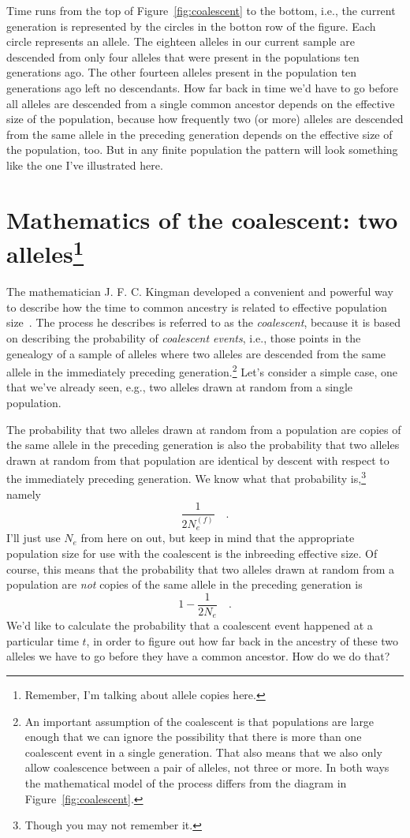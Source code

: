 \documentclass[12pt]{article}
\begin{document}
Time runs from the top of Figure~\ref{fig:coalescent} to the bottom,
i.e., the current generation is represented by the circles in the
botton row of the figure. Each circle represents an allele. The
eighteen alleles in our current sample are descended from only four
alleles that were present in the populations ten generations ago. The
other fourteen alleles present in the population ten generations ago
left no descendants. How far back in time we'd have to go before all
alleles are descended from a single common ancestor depends on the
effective size of the population, because how frequently two (or more)
alleles are descended from the same allele in the preceding generation
depends on the effective size of the population, too. But in any
finite population the pattern will look something like the one I've
illustrated here.

\section*{Mathematics of the coalescent: two
  alleles\footnote{Remember, I'm
  talking about allele copies here.}}

The mathematician J. F. C. Kingman developed a convenient and powerful
way to describe how the time to common ancestry is related to
effective population
size~\cite{Kingman-1982-genealogy,Kingman-1982-coalescent}. The
process he describes is referred to as the {\it coalescent}, because
it is based on describing the probability of {\it coalescent
  events}, i.e., those points in the
genealogy of a sample of alleles where two alleles are descended from
the same allele in the immediately preceding generation.\footnote{An
  important assumption of the coalescent is that populations are large
  enough that we can ignore the possibility that there is more than
  one coalescent event in a single generation. That also means that we
  also only allow coalescence between a pair of alleles, not three or
  more. In both ways the mathematical model of the process differs
  from the diagram in Figure~\ref{fig:coalescent}.}  Let's consider a
simple case, one that we've already seen, e.g., two alleles
drawn at random from a single population.

The probability that two alleles drawn at random from a population are
copies of the same allele in the preceding generation is also the
probability that two alleles drawn at random from that population are
identical by descent with respect to the immediately preceding
generation. We know what that probability is,\footnote{Though you may
not remember it.} namely
\[
\frac{1}{2N_e^{(f)}} \quad .
\]
I'll just use $N_e$ from here on out, but keep in mind that the
appropriate population size for use with the coalescent is the
inbreeding effective size. Of course, this means that the probability
that two alleles drawn at random from a population are {\it not\/}
copies of the same allele in the preceding generation is
\[
1 - \frac{1}{2N_e} \quad .
\]
We'd like to calculate the probability that a coalescent event
happened at a particular time $t$, in order to figure out how far back
in the ancestry of these two alleles we have to go before they have a
common ancestor. How do we do that?
\end{document}
